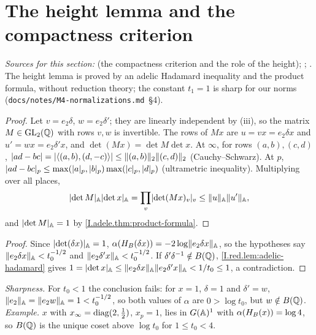 \section{The height lemma and the compactness criterion}\label{sec:red-height}

\noindent\emph{Sources for this section:} \cite[§6]{AIntro} (the compactness criterion and the role of the height);
\cite[Lecture II]{Gel}; \cite[§1]{Bor-fin}. The height lemma is proved by an adelic Hadamard inequality and the product
formula, without reduction theory; the constant $t_1=1$ is sharp for our norms (\texttt{docs/notes/M4-normalizations.md}~§4).

\begin{lemma}
\end{lemma}
\begin{proof}
Let $v=e_2\delta$, $w=e_2\delta'$; they are linearly independent by (iii), so the matrix $M\in\mathrm{GL}_2(\mathbb{Q})$ with rows $v,w$ is invertible. The
rows of $Mx$ are $u=vx=e_2\delta x$ and $u'=wx=e_2\delta'x$, and $\det(Mx)=\det M\det x$. At $\infty$, for rows $(a,b),(c,d)$,
$\lvert ad-bc\rvert=\lvert\langle(a,b),(d,-c)\rangle\rvert\le\lVert(a,b)\rVert_2\lVert(c,d)\rVert_2$ (Cauchy--Schwarz). At $p$,
$\lvert ad-bc\rvert_p\le\max(\lvert a\rvert_p,\lvert b\rvert_p)\max(\lvert c\rvert_p,\lvert d\rvert_p)$ (ultrametric inequality). Multiplying over all places,
\[
  \lvert\det M\rvert_{\mathbb{A}}\lvert\det x\rvert_{\mathbb{A}}=\prod_v\lvert\det(Mx)_v\rvert_v\le\lVert u\rVert_{\mathbb{A}}\lVert u'\rVert_{\mathbb{A}},
\]
and $\lvert\det M\rvert_{\mathbb{A}}=1$ by \cref{I.adele.thm:product-formula}.
\end{proof}

\begin{theorem}
\end{theorem}
\begin{proof}
Since $\lvert\det(\delta x)\rvert_{\mathbb{A}}=1$, $\alpha(H_B(\delta x))=-2\log\lVert e_2\delta x\rVert_{\mathbb{A}}$, so the hypotheses say $\lVert e_2\delta x\rVert_{\mathbb{A}}<t_0^{-1/2}$ and
$\lVert e_2\delta'x\rVert_{\mathbb{A}}<t_0^{-1/2}$. If $\delta'\delta^{-1}\notin B(\mathbb{Q})$, \cref{I.red.lem:adelic-hadamard} gives
$1=\lvert\det x\rvert_{\mathbb{A}}\le\lVert e_2\delta x\rVert_{\mathbb{A}}\lVert e_2\delta'x\rVert_{\mathbb{A}}<1/t_0\le1$, a contradiction.
\end{proof}
\noindent \emph{Sharpness.} For $t_0<1$ the conclusion fails: for $x=1$, $\delta=1$ and $\delta'=w$, $\lVert e_2\rVert_{\mathbb{A}}=\lVert e_2w\rVert_{\mathbb{A}}=1<t_0^{-1/2}$,
so both values of $\alpha$ are $0>\log t_0$, but $w\notin B(\mathbb{Q})$. \emph{Example.} $x$ with $x_\infty=\operatorname{diag}(2,\frac12)$, $x_p=1$, lies in
$G(\mathbb{A})^1$ with $\alpha(H_B(x))=\log4$, so $B(\mathbb{Q})$ is the unique coset above $\log t_0$ for $1\le t_0<4$.

